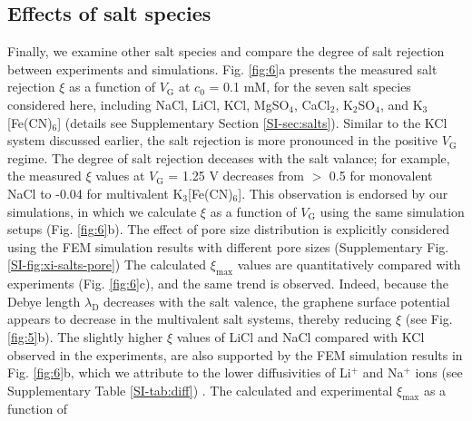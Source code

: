 \documentclass[journal=nalefd,email=true, hyperref=true, keywords=false]{achemso}
\newcommand{\Fig}{Fig.}
\begin{document}
\subsection{Effects of salt species}
\label{sec:salts}

Finally, we examine other salt species and compare the degree of salt
rejection between experiments and simulations. \Fig{} \ref{fig:6}a
presents the measured salt rejection $\xi$ as a function of
$V_{\mathrm{G}}$ at $c_{0}$ = 0.1 mM, for the seven salt species
considered here, including NaCl, LiCl, KCl, MgSO$_{4}$, CaCl$_{2}$,
K$_{2}$SO$_{4}$, and K$_{3}$[Fe(CN)$_{6}$] (details see Supplementary
Section \ref{SI-sec:salts}). Similar to the KCl system discussed
earlier, the salt rejection is more pronounced in the positive
$V_{\mathrm{G}}$ regime. 
The degree of salt rejection deceases with the salt valance; for
example, the measured $\xi$ values at $V_{\mathrm{G}}$ = 1.25 V
decreases from $>$ 0.5 for monovalent NaCl to -0.04 for multivalent
K$_{3}$[Fe(CN)$_{6}$]. This observation is endorsed by our
simulations, in which we calculate $\xi$ as a function of
$V_{\mathrm{G}}$ using the same simulation setups (\Fig{}
\ref{fig:6}b).  { The effect of pore size distribution is explicitly
  considered using the FEM simulation results with different pore
  sizes (Supplementary \Fig{} \ref{SI-fig:xi-salts-pore})} The
calculated $\xi_{\mathrm{max}}$ values are quantitatively compared
with experiments (\Fig{} \ref{fig:6}c), and the same trend is
observed. Indeed, because the Debye length $\lambda_{\mathrm{D}}$
decreases with the salt valence, the graphene surface potential
appears to decrease in the multivalent salt systems, thereby reducing
$\xi$ (see \Fig{} \ref{fig:5}b).  { The slightly higher $\xi$ values
  of LiCl and NaCl compared with KCl observed in the experiments, are
  also supported by the FEM simulation results in \Fig{} \ref{fig:6}b,
  which we attribute to the lower diffusivities of Li$^{+}$ and
  Na$^{+}$ ions (see Supplementary Table \ref{SI-tab:diff}) }.  The
calculated and experimental $\xi_{\mathrm{max}}$ as a function of
\end{document}
